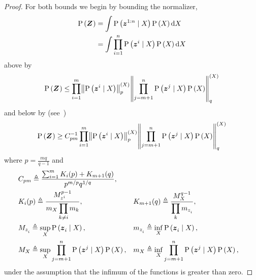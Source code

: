 \begin{proof}
	For both bounds we begin by bounding the normalizer,
	\begin{equation*}
		\begin{split}
			\mathrm{P}\left({\boldsymbol Z_{}}\right) & =\int\mathrm{P}\left({\boldsymbol z_{}^{1:n}}\mid{\ensuremath{X_{}}}\right)\mathrm{P}\left({X_{}}\right)\mathrm{d}X_{}\\
			& =\int\prod_{i=1}^n\mathrm{P}\left({\boldsymbol z_{}^{i}}\mid{\ensuremath{X_{}}}\right)\mathrm{P}\left({X_{}}\right)\mathrm{d}X_{}
		\end{split}
	\end{equation*}
	above by
	\begin{equation}
		\prob{\observationsRV{}}\leq\prod_{i=1}^{m}\pnorm{\probcond{\observationRV{}{i}}{\states{}}}{p}{\states{}}\pnorm{\prod_{j=m+1}^n\probcond{\observationRV{}{j}}{\states{}}\prob{\states{}}}{q}{\states{}}
		\label{eq:holders}
	\end{equation}
	and below by (see~\cite{Wang77cmb})
	\begin{equation}
		\prob{\observationsRV{}}\geq C_{pm}^{-1}\prod_{i=1}^{m}\pnorm{\probcond{\observationRV{}{i}}{\states{}}}{p}{\states{}}\pnorm{\prod_{j=m+1}^n\probcond{\observationRV{}{j}}{\states{}}\prob{\states{}}}{q}{\states{}}\label{eq:reverse_holders}
	\end{equation}
	where $p=\frac{mq}{q-1}$ and
	\begin{align*}
		&C_{pm}\triangleq\frac{\sum_{i=1}^{m} K_i(p)+K_{m+1}(q)}{p^{m/p}q^{1/q}},\\
		&K_i(p)\triangleq\frac{M_{z_{}^{i}}^{p-1}}{\displaystyle m_{X_{}}\prod_{k\neq i}m_k},&&
		K_{m+1}(q)\triangleq\frac{M_{X_{}}^{q-1}}{\displaystyle\prod_{k}m_{z_{i}^{}}},\\
		&M_{z_{i}^{}}\triangleq\sup_{X_{}}\mathrm{P}\left({\boldsymbol z_{i}^{}}\mid{\ensuremath{X_{}}}\right),&&
		m_{z_{i}^{}}\triangleq\inf_{X_{}}\mathrm{P}\left({\boldsymbol z_{i}^{}}\mid{\ensuremath{X_{}}}\right),
		\\
		&M_{X_{}}\triangleq\sup_{X_{}}\prod_{j=m+1}^n\mathrm{P}\left({\boldsymbol z_{}^{j}}\mid{\ensuremath{X_{}}}\right)\mathrm{P}\left({X_{}}\right),&&
		m_{X_{}}\triangleq\inf_{X_{}}\prod_{j=m+1}^n\mathrm{P}\left({\boldsymbol z_{}^{j}}\mid{\ensuremath{X_{}}}\right)\mathrm{P}\left({X_{}}\right),
	\end{align*}
	under the assumption that the infimum of the functions is greater than zero.


\end{proof}
